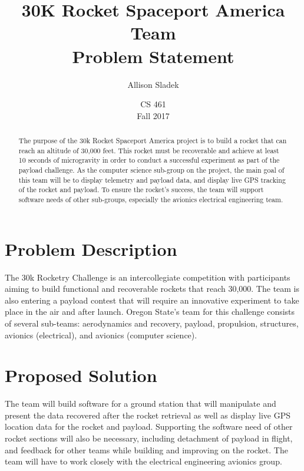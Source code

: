 \documentclass[10pt, letterpaper, twoside, onecolumn]{article}
\title{30K Rocket Spaceport America Team \\Problem Statement}
\author{Allison Sladek}
\date{CS 461\\Fall 2017
}
\begin{document}
\begin{titlepage}
\maketitle

\begin{abstract}
The purpose of the 30k Rocket Spaceport America project is to build a rocket that can reach an altitude of 30,000 feet. This rocket must be recoverable and achieve at least 10 seconds of microgravity in order to conduct a successful experiment as part of the payload challenge. As the computer science sub-group on the project, the main goal of this team will be to display telemetry and payload data, and display live GPS tracking of the rocket and payload. To ensure the rocket’s success, the team will support software needs of other sub-groups, especially the avionics electrical engineering team.
\end{abstract}


\end{titlepage}


\section{Problem Description}

The 30k Rocketry Challenge is an intercollegiate competition with participants aiming to build functional and recoverable rockets that reach 30,000. The team is also entering a payload contest that will require an innovative experiment to take place in the air and after launch. Oregon State’s team for this challenge consists of several sub-teams: aerodynamics and recovery, payload, propulsion, structures, avionics (electrical), and avionics (computer science). 

\section{Proposed Solution} 

The team will build software for a ground station that will manipulate and present the data recovered after the rocket retrieval as well as display live GPS location data for the rocket and payload. Supporting the software need of other rocket sections will also be necessary, including detachment of payload in flight, and feedback for other teams while building and improving on the rocket. The team will have to work closely with the electrical engineering avionics group.
\end{document}
